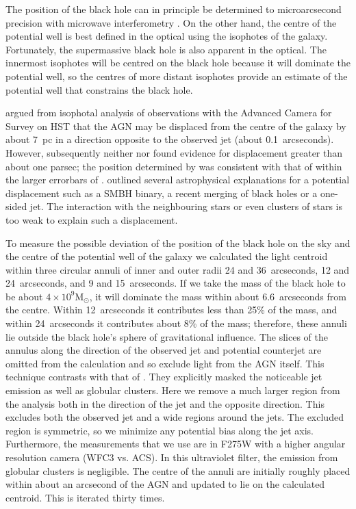 \documentclass[useAMS,usenatbib]{mn2e}
\newcommand{\msun}{\mathrm{M}_\odot}
\begin{document}
The position of the black hole can in principle be determined to
microarcsecond precision with microwave interferometry
\citep{2011ApJ...735...57B}.  On the other hand, the centre of the
potential well is best defined in the optical using the isophotes of
the galaxy.  Fortunately, the supermassive black hole is also apparent
in the optical.  The innermost isophotes will be centred on the black
hole because it will dominate the potential well, so the centres of
more distant isophotes provide an estimate of the potential well that
constrains the black hole.

\citet{2010ApJ...717L...6B} argued from isophotal analysis of
observations with the Advanced Camera for Survey on HST that the AGN
may be displaced from the centre of the galaxy by about 7~pc in a
direction opposite to the observed jet (about 0.1~arcseconds).
However, subsequently 
neither
\citet{2011ApJ...729..119G} nor \citet{2013ApJ...770...86W} found
evidence for displacement greater than about one parsec; the position
determined by \citet{2011ApJ...729..119G} was consistent with that of
\citet{2010ApJ...717L...6B} within the larger errorbars of
\citet{2011ApJ...729..119G}.  \citet{2010ApJ...717L...6B} outlined
several astrophysical explanations for a potential displacement such
as a SMBH binary, a recent merging of black holes or a one-sided jet.
The interaction with the neighbouring stars or even clusters of stars
is too weak to explain such a displacement.


To measure the possible deviation of the position of the black hole on
the sky and the centre of the potential well of the galaxy
we 
calculated 
the light centroid within three circular annuli of inner
and outer radii 24 and 36~arcseconds, 12 and 24~arcseconds, and 9 and
15~arcseconds.   If we take the mass of the
black hole to be about $4\times 10^9\msun$, it will dominate the mass
within about 6.6~arcseconds from the centre.  Within 12~arcseconds it
contributes less than 25\% of the mass, and within 24~arcseconds it
contributes about 8\% of the mass; therefore, these annuli lie outside
the black hole's sphere of gravitational influence.  The slices of the
annulus along the direction of the observed jet and potential
counterjet are omitted from the calculation and so exclude light from
the AGN itself.  This 
technique 
contrasts with that of
\citet{2010ApJ...717L...6B}.  They explicitly masked the noticeable jet
emission as well as globular clusters.  Here we remove a much larger
region from the analysis both in the direction of the jet and the
opposite direction.  This excludes both the observed jet and a wide
regions around the jets.  The excluded region is symmetric, so we
minimize any potential bias along the jet axis.  Furthermore, the
measurements that we use are in F275W with a higher angular resolution
camera (WFC3 vs. ACS).  In this ultraviolet filter, the emission from
globular clusters is negligible.  The centre of the annuli are
initially roughly placed within about an arcsecond of the AGN and
updated to lie on the calculated centroid. This is iterated thirty
times.
\end{document}
